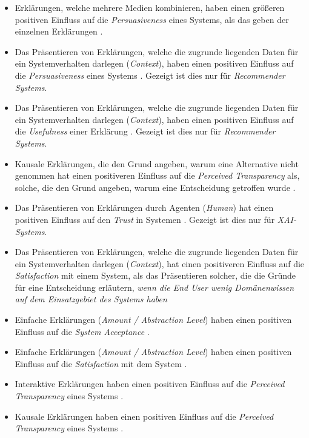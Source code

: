 \begin{itemize}
    \item Erklärungen, welche mehrere Medien kombinieren, haben einen größeren positiven Einfluss auf die \textit{Persuasiveness} eines Systems, als das geben der einzelnen Erklärungen  \cite{sato_action-triggering_2019, kunkel_let_2019, sato_action-triggering_2019, schrills_color_2020, lim_2009_assessing}.
    \item Das Präsentieren von Erklärungen, welche die zugrunde liegenden Daten für ein Systemverhalten darlegen (\textit{Context}), haben einen positiven Einfluss auf die \textit{Persuasiveness} eines Systems \cite{sato_action-triggering_2019, abdulrahman_belief-based_2019}. Gezeigt ist dies nur für \textit{Recommender Systems}.
    \item Das Präsentieren von Erklärungen, welche die zugrunde liegenden Daten für ein Systemverhalten darlegen (\textit{Context}), haben einen positiven Einfluss auf die \textit{Usefulness} einer Erklärung \cite{sato_action-triggering_2019, abdulrahman_belief-based_2019}. Gezeigt ist dies nur für \textit{Recommender Systems}.
    \item Kausale Erklärungen, die den Grund angeben, warum eine Alternative nicht genommen hat einen positiveren Einfluss auf die \textit{Perceived Transparency} als, solche, die den Grund angeben, warum eine Entscheidung getroffen wurde \cite{martin_evaluating_2021, schrills_color_2020, neerincx_using_2018}.
    \item Das Präsentieren von Erklärungen durch Agenten (\textit{Human}) hat einen positiven Einfluss auf den \textit{Trust} in Systemen \cite{weitz_you_2019}. Gezeigt ist dies nur für \textit{XAI-Systems}.
    \item Das Präsentieren von Erklärungen, welche die zugrunde liegenden Daten für ein Systemverhalten darlegen (\textit{Context}), hat einen positiveren Einfluss auf die \textit{Satisfaction} mit einem System, als das Präsentieren solcher, die die Gründe für eine Entscheidung erläutern, \textit{wenn die End User wenig Domänenwissen auf dem Einsatzgebiet des Systems haben} \cite{kaptein_personalised_2017, martin_evaluating_2021}
    \item Einfache Erklärungen (\textit{Amount / Abstraction Level}) haben einen positiven Einfluss auf die \textit{System Acceptance} \cite{hleg2019policy, sovrano_modelling_2020}.
    \item Einfache Erklärungen (\textit{Amount / Abstraction Level}) haben einen positiven Einfluss auf die \textit{Satisfaction} mit dem System \cite{hleg2019policy, sovrano_modelling_2020}.
    \item Interaktive Erklärungen haben einen positiven Einfluss auf die \textit{Perceived Transparency} eines Systems \cite{cheng2019explaining}.
    \item Kausale Erklärungen haben einen positiven Einfluss auf die \textit{Perceived Transparency} eines Systems \cite{chazette2020explainability}.
\end{itemize}

